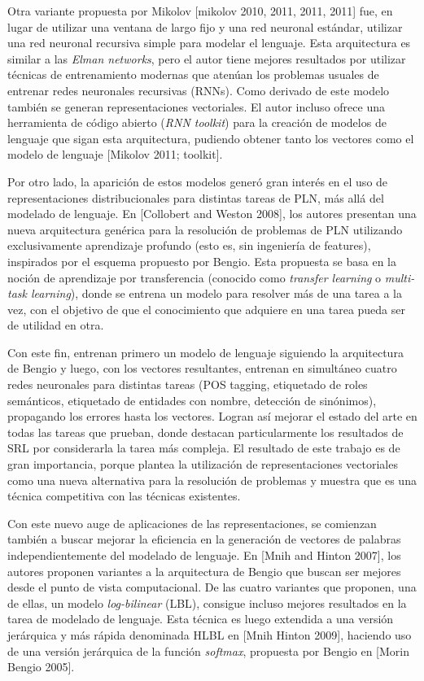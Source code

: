 Otra variante propuesta por Mikolov [mikolov 2010, 2011, 2011, 2011] fue, en lugar de utilizar una
ventana de largo fijo y una red neuronal estándar, utilizar una red neuronal recursiva simple para
modelar el lenguaje. Esta arquitectura es similar a las \textit{Elman networks}, pero el autor tiene
mejores resultados por utilizar técnicas de entrenamiento modernas que atenúan los problemas usuales
de entrenar redes neuronales recursivas (RNNs). Como derivado de este modelo también se generan
representaciones vectoriales. El autor incluso ofrece una herramienta de código abierto (\textit{RNN
toolkit}) para la creación de modelos de lenguaje que sigan esta arquitectura, pudiendo obtener
tanto los vectores como el modelo de lenguaje [Mikolov 2011; toolkit].


Por otro lado, la aparición de estos modelos generó gran interés en el uso de representaciones
distribucionales para distintas tareas de PLN, más allá del modelado de lenguaje. En [Collobert and
Weston 2008], los autores presentan una nueva arquitectura genérica para la resolución de problemas
de PLN utilizando exclusivamente aprendizaje profundo (esto es, sin ingeniería de features),
inspirados por el esquema propuesto por Bengio. Esta propuesta se basa en la noción de aprendizaje
por transferencia (conocido como \textit{transfer learning} o \textit{multi-task learning}), donde
se entrena un modelo para resolver más de una tarea a la vez, con el objetivo de que el conocimiento
que adquiere en una tarea pueda ser de utilidad en otra.

Con este fin, entrenan primero un modelo de lenguaje siguiendo la arquitectura de Bengio y luego,
con los vectores resultantes, entrenan en simultáneo cuatro redes neuronales para distintas tareas
(POS tagging, etiquetado de roles semánticos, etiquetado de entidades con nombre, detección de
sinónimos), propagando los errores hasta los vectores. Logran así mejorar el estado del arte en
todas las tareas que prueban, donde destacan particularmente los resultados de SRL por considerarla
la tarea más compleja. El resultado de este trabajo es de gran importancia, porque plantea la
utilización de representaciones vectoriales como una nueva alternativa para la resolución de
problemas y muestra que es una técnica competitiva con las técnicas existentes.


Con este nuevo auge de aplicaciones de las representaciones, se comienzan también a buscar mejorar
la eficiencia en la generación de vectores de palabras independientemente del modelado de
lenguaje. En [Mnih and Hinton 2007], los autores proponen variantes a la arquitectura de Bengio que
buscan ser mejores desde el punto de vista computacional. De las cuatro variantes que proponen, una
de ellas, un modelo \textit{log-bilinear} (LBL), consigue incluso mejores resultados en la tarea de
modelado de lenguaje. Esta técnica es luego extendida a una versión jerárquica y más rápida
denominada HLBL en [Mnih Hinton 2009], haciendo uso de una versión jerárquica de la función
\textit{softmax}, propuesta por Bengio en [Morin Bengio 2005].


